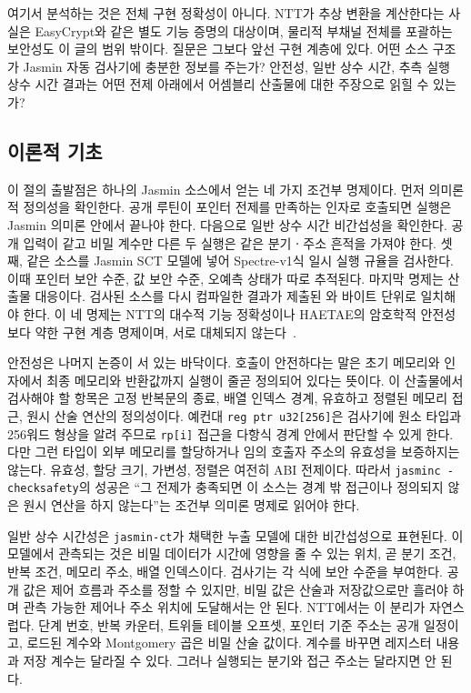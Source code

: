 \documentclass[10pt,twocolumn]{article}
\newcommand{\haetae}{HAETAE}
\newcommand{\jasmin}{Jasmin}
\newcommand{\ct}{상수 시간}
\newcommand{\sct}{추측 실행 상수 시간}
\begin{document}
여기서 분석하는 것은 전체 구현 정확성이 아니다. NTT가 추상 변환을
계산한다는 사실은 EasyCrypt와 같은 별도 기능 증명의 대상이며, 물리적
부채널 전체를 포괄하는 보안성도 이 글의 범위 밖이다. 질문은 그보다
앞선 구현 계층에 있다. 어떤 소스 구조가 \jasmin{} 자동 검사기에 충분한
정보를 주는가? 안전성, 일반 \ct{}, \sct{} 결과는 어떤 전제 아래에서
어셈블리 산출물에 대한 주장으로 읽힐 수 있는가?

\subsection{이론적 기초}

이 절의 출발점은 하나의 \jasmin{} 소스에서 얻는 네 가지 조건부
명제이다. 먼저 의미론적 정의성을 확인한다. 공개 루틴이 포인터 전제를
만족하는 인자로 호출되면 실행은 \jasmin{} 의미론 안에서 끝나야 한다.
다음으로 일반 상수 시간 비간섭성을 확인한다. 공개 입력이 같고 비밀
계수만 다른 두 실행은 같은 분기ㆍ주소 흔적을 가져야 한다. 셋째, 같은
소스를 \jasmin{} SCT 모델에 넣어 Spectre-v1식 일시 실행 규율을 검사한다.
이때 포인터 보안 수준, 값 보안 수준, 오예측 상태가 따로 추적된다. 마지막
명제는 산출물 대응이다. 검사된 소스를 다시 컴파일한 결과가 제출된
와 바이트 단위로 일치해야 한다. 이 네 명제는 NTT의 대수적
기능 정확성이나 \haetae{}의 암호학적 안전성보다 약한 구현 계층 명제이며,
서로 대체되지 않는다~\cite{JasminFramework2026,Oliveira2022Thesis,JasminDocs}.

안전성은 나머지 논증이 서 있는 바닥이다. 호출이 안전하다는 말은 초기
메모리와 인자에서 최종 메모리와 반환값까지 실행이 줄곧 정의되어 있다는
뜻이다. 이 산출물에서 검사해야 할 항목은 고정 반복문의 종료, 배열
인덱스 경계, 유효하고 정렬된 메모리 접근, 원시 산술 연산의 정의성이다.
예컨대 \texttt{reg ptr u32[256]}은 검사기에 원소 타입과 256워드 형상을
알려 주므로 \texttt{rp[i]} 접근을 다항식 경계 안에서 판단할 수 있게 한다.
다만 그런 타입이 외부 메모리를 할당하거나 임의 호출자 주소의 유효성을
보증하지는 않는다. 유효성, 할당 크기, 가변성, 정렬은 여전히 ABI 전제이다.
따라서 \texttt{jasminc -checksafety}의 성공은 “그 전제가 충족되면 이
소스는 경계 밖 접근이나 정의되지 않은 원시 연산을 하지 않는다”는 조건부
의미론 명제로 읽어야 한다.

일반 상수 시간성은 \texttt{jasmin-ct}가 채택한 누출 모델에 대한
비간섭성으로 표현된다. 이 모델에서 관측되는 것은 비밀 데이터가 시간에
영향을 줄 수 있는 위치, 곧 분기 조건, 반복 조건, 메모리 주소, 배열
인덱스이다. 검사기는 각 식에 보안 수준을 부여한다. 공개 값은 제어 흐름과
주소를 정할 수 있지만, 비밀 값은 산술과 저장값으로만 흘러야 하며 관측
가능한 제어나 주소 위치에 도달해서는 안 된다. NTT에서는 이 분리가
자연스럽다. 단계 번호, 반복 카운터, 트위들 테이블 오프셋, 포인터 기준
주소는 공개 일정이고, 로드된 계수와 Montgomery 곱은 비밀 산술 값이다.
계수를 바꾸면 레지스터 내용과 저장 계수는 달라질 수 있다. 그러나 실행되는
분기와 접근 주소는 달라지면 안 된다.
\end{document}
